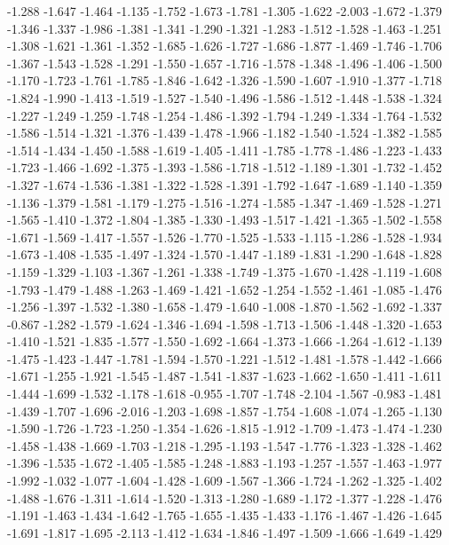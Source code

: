 \documentclass[9pt]{article}
\theoremstyle{plain}
\theoremstyle{definition}
\theoremstyle{remark}
\numberwithin{equation}{section}
\begin{document}
-1.288
-1.647
-1.464
-1.135
-1.752
-1.673
-1.781
-1.305
-1.622
-2.003
-1.672
-1.379
-1.346
-1.337
-1.986
-1.381
-1.341
-1.290
-1.321
-1.283
-1.512
-1.528
-1.463
-1.251
-1.308
-1.621
-1.361
-1.352
-1.685
-1.626
-1.727
-1.686
-1.877
-1.469
-1.746
-1.706
-1.367
-1.543
-1.528
-1.291
-1.550
-1.657
-1.716
-1.578
-1.348
-1.496
-1.406
-1.500
-1.170
-1.723
-1.761
-1.785
-1.846
-1.642
-1.326
-1.590
-1.607
-1.910
-1.377
-1.718
-1.824
-1.990
-1.413
-1.519
-1.527
-1.540
-1.496
-1.586
-1.512
-1.448
-1.538
-1.324
-1.227
-1.249
-1.259
-1.748
-1.254
-1.486
-1.392
-1.794
-1.249
-1.334
-1.764
-1.532
-1.586
-1.514
-1.321
-1.376
-1.439
-1.478
-1.966
-1.182
-1.540
-1.524
-1.382
-1.585
-1.514
-1.434
-1.450
-1.588
-1.619
-1.405
-1.411
-1.785
-1.778
-1.486
-1.223
-1.433
-1.723
-1.466
-1.692
-1.375
-1.393
-1.586
-1.718
-1.512
-1.189
-1.301
-1.732
-1.452
-1.327
-1.674
-1.536
-1.381
-1.322
-1.528
-1.391
-1.792
-1.647
-1.689
-1.140
-1.359
-1.136
-1.379
-1.581
-1.179
-1.275
-1.516
-1.274
-1.585
-1.347
-1.469
-1.528
-1.271
-1.565
-1.410
-1.372
-1.804
-1.385
-1.330
-1.493
-1.517
-1.421
-1.365
-1.502
-1.558
-1.671
-1.569
-1.417
-1.557
-1.526
-1.770
-1.525
-1.533
-1.115
-1.286
-1.528
-1.934
-1.673
-1.408
-1.535
-1.497
-1.324
-1.570
-1.447
-1.189
-1.831
-1.290
-1.648
-1.828
-1.159
-1.329
-1.103
-1.367
-1.261
-1.338
-1.749
-1.375
-1.670
-1.428
-1.119
-1.608
-1.793
-1.479
-1.488
-1.263
-1.469
-1.421
-1.652
-1.254
-1.552
-1.461
-1.085
-1.476
-1.256
-1.397
-1.532
-1.380
-1.658
-1.479
-1.640
-1.008
-1.870
-1.562
-1.692
-1.337
-0.867
-1.282
-1.579
-1.624
-1.346
-1.694
-1.598
-1.713
-1.506
-1.448
-1.320
-1.653
-1.410
-1.521
-1.835
-1.577
-1.550
-1.692
-1.664
-1.373
-1.666
-1.264
-1.612
-1.139
-1.475
-1.423
-1.447
-1.781
-1.594
-1.570
-1.221
-1.512
-1.481
-1.578
-1.442
-1.666
-1.671
-1.255
-1.921
-1.545
-1.487
-1.541
-1.837
-1.623
-1.662
-1.650
-1.411
-1.611
-1.444
-1.699
-1.532
-1.178
-1.618
-0.955
-1.707
-1.748
-2.104
-1.567
-0.983
-1.481
-1.439
-1.707
-1.696
-2.016
-1.203
-1.698
-1.857
-1.754
-1.608
-1.074
-1.265
-1.130
-1.590
-1.726
-1.723
-1.250
-1.354
-1.626
-1.815
-1.912
-1.709
-1.473
-1.474
-1.230
-1.458
-1.438
-1.669
-1.703
-1.218
-1.295
-1.193
-1.547
-1.776
-1.323
-1.328
-1.462
-1.396
-1.535
-1.672
-1.405
-1.585
-1.248
-1.883
-1.193
-1.257
-1.557
-1.463
-1.977
-1.992
-1.032
-1.077
-1.604
-1.428
-1.609
-1.567
-1.366
-1.724
-1.262
-1.325
-1.402
-1.488
-1.676
-1.311
-1.614
-1.520
-1.313
-1.280
-1.689
-1.172
-1.377
-1.228
-1.476
-1.191
-1.463
-1.434
-1.642
-1.765
-1.655
-1.435
-1.433
-1.176
-1.467
-1.426
-1.645
-1.691
-1.817
-1.695
-2.113
-1.412
-1.634
-1.846
-1.497
-1.509
-1.666
-1.649
-1.429
\end{document}
